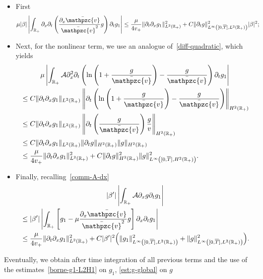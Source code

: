 \documentclass[AHL,Unicode,longabstracts,published]{cedram}
\newcommand{\R}{\mathbb{R}}
\newcommand{\p}{\partial}
\newcommand{\bv}{\bar{\mathpzc{v}}}
\newcommand{\cA}{\mathcal A}
\begin{document}
\begin{itemize}
\item First
\begin{align*}
\mu |\beta| \left|\int_{\R_+} \partial_x \partial_t \left(\dfrac{\partial_x \bv}{\bv^2} g \right) \partial_t g_1 \right| & \leq \dfrac{\mu}{4 v_+} \|\partial_t \partial_x g_1\|_{L^2(\R_+)}^2 + C \|\partial_t g\|_{L^\infty\left([0,\overline{T}],L^2(\R_+)\right)}^2 |\beta|^2;
\end{align*}
\item Next, for the nonlinear term, we use an analogue of~\eqref{diff-quadratic}, which yields
\begin{multline*}
 \mu \left| \int_{\R_+} \cA \partial_x^2 \partial_t \left(\ln \left(1+ \dfrac{g}{\bv}\right) - \dfrac{g}{\bv} \right) \partial_t g_1\right|\\
\begin{aligned}
&\leq C\|\p_t \p_x g_1\|_{L^2(\R_+)} \left\| \partial_t \left(\ln \left(1+ \dfrac{g}{\bv}\right) - \dfrac{g}{\bv} \right)\right\|_{H^2(\R_+)}\\
&\leq C\|\p_t \p_x g_1\|_{L^2(\R_+)} \left\| \p_t \left(\frac{g}{\bv}\right) \frac{g}{v} \right\|_{H^2(\R_+)}\\
&\leq C\|\p_t \p_x g_1\|_{L^2(\R_+)} \|\p_t g\|_{H^2(\R_+)} \|g\|_{H^2(\R_+)}\\
&\leq \dfrac{\mu}{4v_+} \|\partial_t \partial_x g_1\|_{L^2(\R_+)}^2 + C \|\p_t g\|_{H^2(\R_+)}^2 \|g\|_{L^\infty\left([0, \overline{T}], H^2(\R_+)\right)}^2.
\end{aligned}
\end{multline*}



\item Finally, recalling~\eqref{comm-A-dx}
\begin{multline*}
|\beta'| \left| \int_{\R_+}\cA\partial_x g \partial_t g_1 \right|\\
\begin{aligned}
& \leq |\beta'| \left| \int_{\R_+}\left[g_1 - \mu \dfrac{\partial_x \bv}{\bv^2} g \right] \partial_x \partial_t g_1 \right| \\
& \leq \dfrac{\mu}{4v_+} \|\partial_t \partial_x g_1\|_{L^2(\R_+)}^2 + C |\beta'|^2 \Big(\|g_1\|_{L^\infty\left([0,\overline{T}],L^2(\R_+)\right)}^2 + \|g\|_{L^\infty\left([0,\overline{T}],L^2(\R_+)\right)}^2\Big).
\end{aligned}
\end{multline*}
\end{itemize}
Eventually, we obtain after time integration of all previous terms and the use of the estimates~\eqref{borne-g1-L2H1} on $g_1$, \eqref{est:g-global} on $g$
\end{document}
